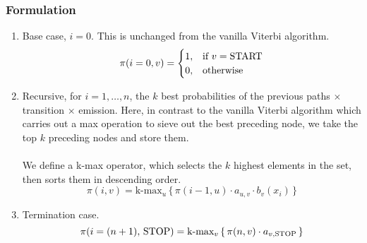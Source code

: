 \documentclass[9pt,twocolumn]{article}
\newcommand{\START}{\text{\lstinline{START}}}
\newcommand{\STOP}{\text{\lstinline{STOP}}}
\begin{document}
            \subsubsection*{Formulation}
            \begin{enumerate}



                \item
                Base case, $i = 0$. This is unchanged from the vanilla Viterbi algorithm.
                \begin{equation}
                \pi(i=0,v) = 
                \begin{cases}
                  1, & \text{if}\ v=\START \\
                  0, & \text{otherwise}
                \end{cases}
                \end{equation}
                
            \item
                Recursive, for $i = 1, \ldots, n$, the $k$ best probabilities of the previous paths $\times$ transition $\times$ emission. Here, in contrast to the vanilla Viterbi algorithm which carries out a max operation to sieve out the best preceding node, we take the top $k$ preceding nodes and store them.\\ \\
                We define a k-max operator, which selects the $k$ highest elements in the set, then sorts them in descending order.
                \begin{equation}
                    \pi(i,v) = {\text{k-max}}_u\,\{\,{\pi(i-1, u) \cdot a_{u,v} \cdot b_v(x_i)}\,\}
                \end{equation}

            \item
                Termination case.
                \begin{equation}
                    \pi(i=(n+1),\,\STOP) = {\text{k-max}}_v\,\{\,\pi(n,v) \cdot a_{v, \STOP}\,\}
                \end{equation}


\end{enumerate}
\end{document}
